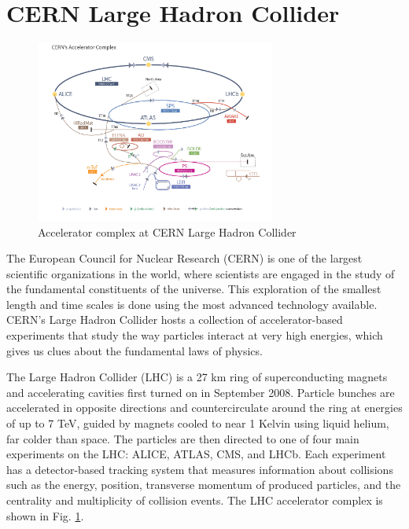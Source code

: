 \section{CERN Large Hadron Collider}
\begin{figure}[H]
    \centering
    \includegraphics[width=0.7\textwidth]{figures/CERN/LHC_accelerator_complex.jpg}
    \caption{Accelerator complex at CERN Large Hadron Collider \cite{CernAcceleratorComplex}}
    \label{fig:CERN_Accelerator_Complex}
\end{figure}

The European Council for Nuclear Research (CERN) is one of the largest scientific organizations in the world, where scientists are engaged in the study of the fundamental constituents of the universe. This exploration of the smallest length and time scales is done using the most advanced technology available. CERN's Large Hadron Collider hosts a collection of accelerator-based experiments that study the way particles interact at very high energies, which gives us clues about the fundamental laws of physics. 

The Large Hadron Collider (LHC) is a 27 km ring of superconducting magnets and accelerating cavities first turned on in September 2008. Particle bunches are accelerated in opposite directions and countercirculate around the ring at energies of up to 7 TeV, guided by magnets cooled to near 1 Kelvin using liquid helium, far colder than space. The particles are then directed to one of four main experiments on the LHC: ALICE, ATLAS, CMS, and LHCb. Each experiment has a detector-based tracking system that measures information about collisions such as the energy, position, transverse momentum of produced particles, and the centrality and multiplicity of collision events. The LHC accelerator complex is shown in Fig. \ref{fig:CERN_Accelerator_Complex}.


